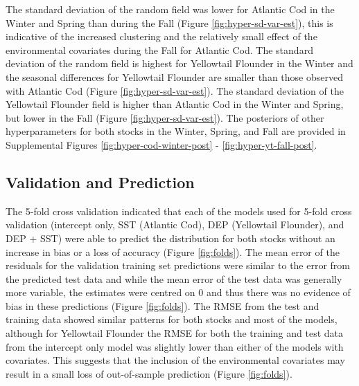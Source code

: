 \documentclass[
]{article}
\begin{document}
The standard deviation of the random field was lower for Atlantic Cod in the Winter and Spring than during the Fall (Figure \ref{fig:hyper-sd-var-est}), this is indicative of the increased clustering and the relatively small effect of the environmental covariates during the Fall for Atlantic Cod. The standard deviation of the random field is highest for Yellowtail Flounder in the Winter and the seasonal differences for Yellowtail Flounder are smaller than those observed with Atlantic Cod (Figure \ref{fig:hyper-sd-var-est}). The standard deviation of the Yellowtail Flounder field is higher than Atlantic Cod in the Winter and Spring, but lower in the Fall (Figure \ref{fig:hyper-sd-var-est}). The posteriors of other hyperparameters for both stocks in the Winter, Spring, and Fall are provided in Supplemental Figures \ref{fig:hyper-cod-winter-post} - \ref{fig:hyper-yt-fall-post}.

\hypertarget{validation-and-prediction}{%
\subsection{Validation and Prediction}\label{validation-and-prediction}}

The 5-fold cross validation indicated that each of the models used for 5-fold cross validation (intercept only, SST (Atlantic Cod), DEP (Yellowtail Flounder), and DEP + SST) were able to predict the distribution for both stocks without an increase in bias or a loss of accuracy (Figure \ref{fig:folds}). The mean error of the residuals for the validation training set predictions were similar to the error from the predicted test data and while the mean error of the test data was generally more variable, the estimates were centred on 0 and thus there was no evidence of bias in these predictions (Figure \ref{fig:folds}). The RMSE from the test and training data showed similar patterns for both stocks and most of the models, although for Yellowtail Flounder the RMSE for both the training and test data from the intercept only model was slightly lower than either of the models with covariates. This suggests that the inclusion of the environmental covariates may result in a small loss of out-of-sample prediction (Figure \ref{fig:folds}).
\end{document}
